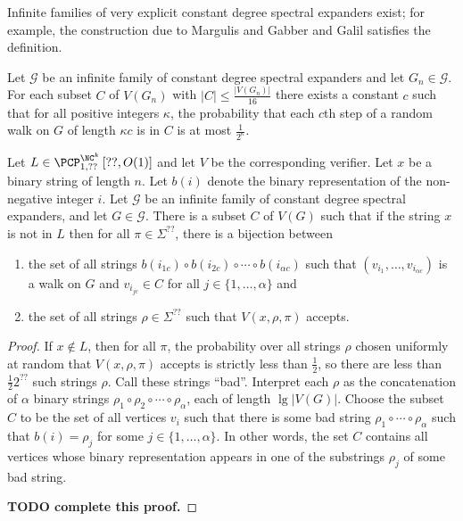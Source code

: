 \documentclass[]{article}
\newcommand{\PCPcs}[5]{\PCP^{#1}_{#2, #3}\left[#4, #5\right]}
\begin{document}
Infinite families of very explicit constant degree spectral expanders exist; for example, the construction due to Margulis \cite{margulis} and Gabber and Galil \cite{gg81} satisfies the definition.

\begin{lemma}\label{lem:expander}
  Let $\mathcal{G}$ be an infinite family of constant degree spectral expanders and let $G_n \in \mathcal{G}$.
  For each subset $C$ of $V(G_n)$ with $|C| \leq \frac{|V(G_n)|}{16}$ there exists a constant $c$ such that for all positive integers $\kappa$, the probability that each $c$th step of a random walk on $G$ of length $\kappa c$ is in $C$ is at most $\frac{1}{2^\kappa}$.
\end{lemma}

\begin{lemma}\label{lem:badsubset}
  Let $L \in \PCPcs{\NC^k}{1}{??}{??}{O(1)}$ and let $V$ be the corresponding \PCP{} verifier.
  Let $x$ be a binary string of length $n$.
  Let $b(i)$ denote the binary representation of the non-negative integer $i$.
  Let $\mathcal{G}$ be an infinite family of constant degree spectral expanders, and let $G \in \mathcal{G}$.
  There is a subset $C$ of $V(G)$ such that if the string $x$ is not in $L$ then for all $\pi \in \Sigma^{??}$, there is a bijection between
  \begin{enumerate}
  \item the set of all strings $b(i_{1c}) \circ b(i_{2c}) \circ \dotsb \circ b(i_{\alpha c})$ such that $(v_{i_1}, \dotsc, v_{i_{\alpha c}})$ is a walk on $G$ and $v_{i_{jc}} \in C$ for all $j \in \{1, \dotsc, \alpha\}$ and
  \item the set of all strings $\rho \in \Sigma^{??}$ such that $V(x, \rho, \pi)$ accepts.
  \end{enumerate}
\end{lemma}
\begin{proof}
  If $x \notin L$, then for all $\pi$, the probability over all strings $\rho$ chosen uniformly at random that $V(x, \rho, \pi)$ accepts is strictly less than $\frac{1}{2}$, so there are less than $\frac{1}{2} 2^{??}$ such strings $\rho$.
  Call these strings ``bad''.
  Interpret each $\rho$ as the concatenation of $\alpha$ binary strings $\rho_1 \circ \rho_2 \circ \dotsb \circ \rho_\alpha$, each of length $\lg |V(G)|$.
  Choose the subset $C$ to be the set of all vertices $v_i$ such that there is some bad string $\rho_1 \circ \dotsb \circ \rho_\alpha$ such that $b(i) = \rho_j$ for some $j \in \{1, \dotsc, \alpha\}$.
  In other words, the set $C$ contains all vertices whose binary representation appears in one of the substrings $\rho_j$ of some bad string.

  \textbf{TODO complete this proof.}
\end{proof}
\end{document}
